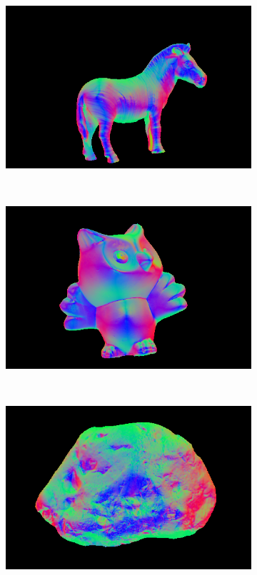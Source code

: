 \documentclass{paper}
\begin{document}
\begin{figure}[h!]
\begin{subfigure}{0.3\textwidth}
        \end{subfigure}
        \begin{subfigure}{0.3\textwidth}
                \includegraphics[width=\textwidth]{report_fig/horse_n}
        \end{subfigure}
        ~ 
        \begin{subfigure}{0.3\textwidth}
                \includegraphics[width=\textwidth]{report_fig/owl_n}
        \end{subfigure}
        ~ 
        \begin{subfigure}{0.3\textwidth}
                \includegraphics[width=\textwidth]{report_fig/rock_n}

\end{subfigure}
\end{figure}
\end{document}
